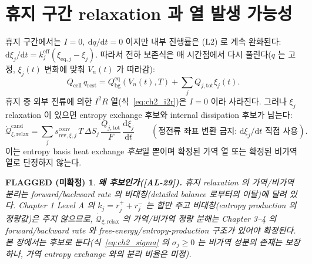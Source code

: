 \documentclass[11pt,a4paper]{article}
\newtheorem*{flagbox}{FLAGGED (미확정)}
\newcommand{\dd}{\mathrm{d}}
\newcommand{\eff}{\mathrm{eff}}
\newcommand{\eq}{\mathrm{eq}}
\newcommand{\bg}{\mathrm{bg}}
\newcommand{\cell}{\mathrm{cell}}
\newcommand{\tot}{\mathrm{tot}}
\newcommand{\rev}{\mathrm{rev}}
\newcommand{\rlx}{\mathrm{relax}}
\newcommand{\cand}{\mathrm{cand}}
\newcommand{\conv}{\mathrm{conv}}
\newcommand{\AL}[1]{\textsf{[AL-#1]}}
\begin{document}
\section{휴지 구간 relaxation 과 열 발생 가능성}\label{sec:ch2_rest}
휴지 구간에서는 $I=0,\ \dd q/\dd t=0$ 이지만 내부 진행률은 (L2) 로 계속 완화된다:
$\dd\xi_j/\dd t=k_j^{\eff}(\xi_{\eq,j}-\xi_j)$. 따라서 전하 보존식은 매 시간점에서 다시 풀린다($q$ 는 고정,
$\xi_j(t)$ 변화에 맞춰 $V_n(t)$ 가 따라감):
\begin{equation}
Q_\cell\,q_{\mathrm{rest}}=Q_\bg^{\eq}(V_n(t),T)+\sum_jQ_{j,\tot}\xi_j(t).
\label{eq:ch2_rest_balance}
\end{equation}
휴지 중 외부 전류에 의한 $I^2R$ 열(식~\eqref{eq:ch2_i2r})은 $I=0$ 이라 사라진다. 그러나 $\xi_j$ relaxation 이
있으면 entropy exchange 후보와 internal dissipation 후보가 남는다:
\begin{equation}
\dot{\mathcal Q}_{\xi,\rlx}^{\cand}=\sum_j s_{\rev,\xi,j}^{\conv}\,T\,\Delta S_j\,\frac{Q_{j,\tot}}{F}\,\frac{\dd\xi_j}{\dd t}
\qquad(\text{정전류 좌표 변환 금지: } \dd\xi_j/\dd t \text{ 직접 사용}).
\label{eq:ch2_relax}
\end{equation}
이는 entropy basis heat exchange \emph{후보}일 뿐이며 확정된 가역 열 또는 확정된 비가역 열로 단정하지 않는다.
\begin{flagbox}
\textbf{왜 후보인가(\AL{29}).} 휴지 relaxation 의 가역/비가역 분리는 forward/backward rate 의 비대칭(detailed
balance 로부터의 이탈)에 달려 있다. Chapter 1 Level A 의 $k_j=r_j^++r_j^-$ 는 \emph{합}만 주고 비대칭(entropy
production 의 정량값)은 주지 않으므로, $\dot{\mathcal Q}_{\xi,\rlx}$ 의 가역/비가역 \emph{정량} 분해는 Chapter
3--4 의 forward/backward rate 와 free-energy/entropy-production 구조가 있어야 확정된다. 본 장에서는 후보로
둔다(식~\eqref{eq:ch2_sigma} 의 $\sigma_j\ge0$ 는 비가역 \emph{성분}의 존재는 보장하나, 가역 entropy exchange
와의 분리 비율은 미정).
\end{flagbox}

\end{document}
